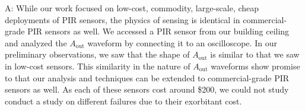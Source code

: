 \documentclass[manuscript]{acmart}
\newcommand{\aout}{$A_{\text{out}}$\xspace}
\newcommand{\sol}{{PIRMedic}\xspace}
\begin{document}
\begin{description}[style=nextline]
	\item[Q: Does \sol work with high-grade PIR sensors?]
	A:  While our work focused on low-cost, commodity, large-scale, cheap deployments of PIR sensors, the physics of sensing is identical in commercial-grade PIR sensors as well. We accessed a PIR sensor from our building ceiling and analyzed the \aout waveform by connecting it to an oscilloscope. In our preliminary observations, we saw that the shape of \aout is similar to that we saw in low-cost sensors. This similarity in the nature of \aout waveforms show promise to that our analysis and techniques can be extended to commercial-grade PIR sensors as well. As each of these sensors cost around \$200, we could not study conduct a study on different failures due to their exorbitant cost.
\end{description}






















































 
\end{document}
